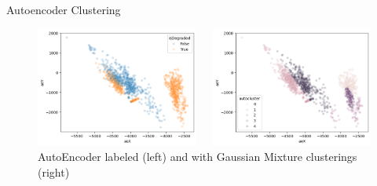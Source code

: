 \begin{frame}{Autoencoder Clustering}
    \centering
    \begin{figure}
        \begin{columns}
            \begin{column}{0.5\textwidth}
                \includegraphics[height=\textheight,width=\textwidth,keepaspectratio]{images/auto_clustering_labeled.png}
            \end{column}
            \begin{column}{0.5\textwidth}
                \includegraphics[height=\textheight,width=\textwidth,keepaspectratio]{images/auto_clustering.png}
            \end{column}
        \end{columns}
        \caption{AutoEncoder labeled (left) and with Gaussian Mixture clusterings (right)}
    \end{figure}
\end{frame}


